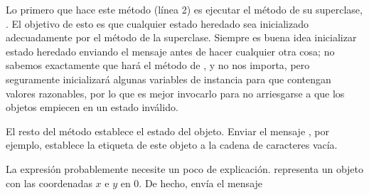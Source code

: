 \documentclass[a4paper,10pt,twoside]{book}
\begin{document}

Lo primero que hace este método (línea 2) es ejecutar el método  de su superclase, .
El objetivo de esto es que cualquier estado heredado sea inicializado adecuadamente por el método  de la superclase.
Siempre es buena idea inicializar estado heredado enviando el mensaje  antes de hacer cualquier otra cosa; no sabemos exactamente que hará el método  de , y no nos importa, pero seguramente inicializará algunas variables de instancia para que contengan valores razonables, por lo que es mejor invocarlo para no arriesgarse a que los objetos empiecen en un estado inválido.


El resto del método establece el estado del objeto.
Enviar el mensaje , por ejemplo, establece la etiqueta de este objeto a la cadena de caracteres vacía.


La expresión  probablemente necesite un poco de explicación.
 representa un objeto  con las coordenadas $x$ e $y$ en 0.
De hecho,  envía el mensaje 

\end{document}
